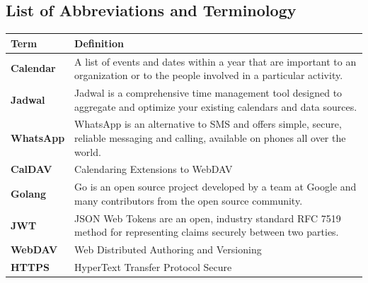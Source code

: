 \documentclass[12pt,a4paper]{report}
\begin{document}
\begin{singlespace}
\newpage

\tableofcontents

\newpage
\listoffigures


\newpage
\listoftables

\newpage

\chapter*{List of Abbreviations and Terminology}

\begin{center}
    \begin{longtable}{p{}p{}}
    \toprule
    \textbf{Term} & \textbf{Definition} \\
    \midrule
    \endhead
    
    \textbf{Calendar} & A list of events and dates within a year that are important to an organization or to the people involved in a particular activity. \cite{def:calendar} \\[1ex]
    
    \textbf{Jadwal} & Jadwal is a comprehensive time management tool designed to aggregate and optimize your existing calendars and data sources. \\[1ex]
    
    \textbf{WhatsApp} & WhatsApp is an alternative to SMS and offers simple, secure, reliable messaging and calling, available on phones all over the world. \cite{whatsapp-about} \\[1ex]
    
    \textbf{CalDAV} & Calendaring Extensions to WebDAV \\[1ex]
    
    \textbf{Golang} & Go is an open source project developed by a team at Google and many contributors from the open source community. \cite{def:Golang}\\[1ex]
    
    \textbf{JWT} & JSON Web Tokens are an open, industry standard RFC 7519 method for representing claims securely between two parties. \cite{def:JWT}\\[1ex]
    
    \textbf{WebDAV} & Web Distributed Authoring and Versioning \\[1ex]
    
    \textbf{HTTPS} & HyperText Transfer Protocol Secure \\[1ex]
    

\end{longtable}
\end{center}
\end{singlespace}
\end{document}
